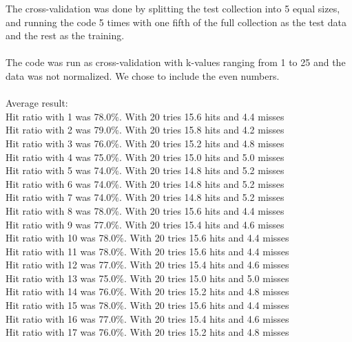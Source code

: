 \documentclass{article}
\begin{document}
The cross-validation was done by splitting the test collection into
5 equal sizes, and running the code 5 times with one fifth of the full
collection as the test data and the rest as the training.\\\\ The code
was run as cross-validation with k-values ranging from 1 to 25 and the
data was not normalized. We chose to include the even numbers.\\\\
Average result:\\ 
Hit ratio with 1 was   {\color{green}78.0\%}. With 20 tries 15.6 hits and 4.4 misses\\
Hit ratio with 2 was   {\color{green}79.0\%}. With 20 tries 15.8 hits and 4.2 misses\\
Hit ratio with 3 was   {\color{green}76.0\%}. With 20 tries 15.2 hits and 4.8 misses\\
Hit ratio with 4 was   {\color{green}75.0\%}. With 20 tries 15.0 hits and 5.0 misses\\
Hit ratio with 5 was   {\color{green}74.0\%}. With 20 tries 14.8 hits and 5.2 misses\\
Hit ratio with 6 was   {\color{green}74.0\%}. With 20 tries 14.8 hits and 5.2 misses\\
Hit ratio with 7 was   {\color{green}74.0\%}. With 20 tries 14.8 hits and 5.2 misses\\
Hit ratio with 8 was   {\color{green}78.0\%}. With 20 tries 15.6 hits and 4.4 misses\\
Hit ratio with 9 was   {\color{green}77.0\%}. With 20 tries 15.4 hits and 4.6 misses\\
Hit ratio with 10 was  {\color{green}78.0\%}. With 20 tries 15.6 hits and 4.4 misses\\
Hit ratio with 11 was  {\color{green}78.0\%}. With 20 tries 15.6 hits and 4.4 misses\\
Hit ratio with 12 was  {\color{green}77.0\%}. With 20 tries 15.4 hits and 4.6 misses\\
Hit ratio with 13 was  {\color{green}75.0\%}. With 20 tries 15.0 hits and 5.0 misses\\
Hit ratio with 14 was  {\color{green}76.0\%}. With 20 tries 15.2 hits and 4.8 misses\\
Hit ratio with 15 was  {\color{green}78.0\%}. With 20 tries 15.6 hits and 4.4 misses\\
Hit ratio with 16 was  {\color{green}77.0\%}. With 20 tries 15.4 hits and 4.6 misses\\
Hit ratio with 17 was  {\color{green}76.0\%}. With 20 tries 15.2 hits and 4.8 misses\\
\end{document}
